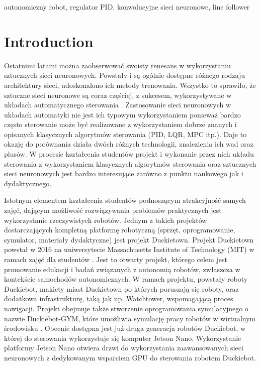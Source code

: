 \documentclass[conference]{IEEEtran}
\begin{document}
\begin{IEEEkeywords}
autonomiczny robot, regulator PID, konwolucyjne sieci neuronowe, line follower
\end{IEEEkeywords}
%
\section{Introduction}
Ostatnimi latami można zaobserwować swoisty renesans w wykorzystaniu sztucznych sieci neuronowych. Powstały i są ogólnie dostępne różnego rodzaju architektury sieci, udoskonalono ich metody trenowania. Wszystko to sprawiło, że  sztuczne sieci neuronowe są coraz częściej, z sukcesem, wykorzystywane w układach automatycznego sterowania \cite{algor2030973, 786109}. Zastosowanie sieci neuronowych w układach automatyki nie jest ich typowym wykorzystaniem ponieważ bardzo często sterowanie może być realizowane z wykorzystaniem dobrze znanych i opisanych klasycznych algorytmów sterowania (PID, LQR, MPC itp.). Daje to okazję do porównania działa dwóch różnych technologii, znalezienia ich wad oraz plusów. W procesie kształcenia studentów projekt i wykonanie przez nich układu sterowania z wykorzystaniem klasycznych algorytmów sterowania oraz sztucznych sieci neuronowych jest bardzo interesujące zarówno z punktu naukowego jak i dydaktycznego.

Istotnym elementem kształcenia studentów podnoszącym atrakcyjność samych zajęć, dającym możliwość rozwiązywania problemów praktycznych jest wykorzystanie rzeczywistych robotów. Jednym z takich projektów dostarczających kompletną platformę robotyczną (sprzęt, oprogramowanie, symulator, materiały dydaktyczne) jest projekt Duckietown.
Projekt Duckietown powstał w 2016 na uniwersytecie Massachusetts Institute of Technology (MIT) w ramach zajęć dla studentów \cite{paull2017duckietown}. Jest to otwarty projekt, którego celem jest promowanie edukacji i badań związanych z autonomią robotów, zwłaszcza w kontekście samochodów autonomicznych. W ramach projektu, powstały roboty Duckiebot, makiety miast Duckietown po których poruszają się roboty, oraz dodatkowa infrastrukturę, taką jak np. Watchtower, wspomagającą proces nawigacji. 
Projekt obejmuje także stworzenie oprogramowania symulacyjnego o nazwie Duckiebot-GYM, które umożliwia symulację pracy robotów w wirtualnym środowisku \cite{gym_duckietown}. Obecnie dostępna jest już druga generacja robotów Duckiebot, w której do sterowania wykorzystuje się komputer Jetson Nano. Wykorzystanie platformy Jetson Nano otwiera drzwi do wykorzystania zaawansowanych sieci neuronowych z dedykowanym wsparciem GPU do sterowania robotem Duckiebot.
\end{document}
